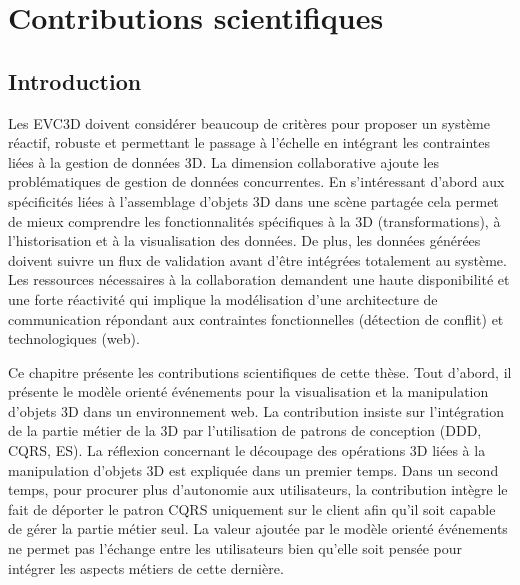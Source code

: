 \chapter{Contributions scientifiques}
\chaptertable
\section{Introduction}
Les \gls{EVC3D} doivent considérer beaucoup de critères pour 
proposer un système réactif, robuste et permettant le passage à l'échelle en 
intégrant les contraintes liées à la gestion de données \gls{3D}. La dimension 
collaborative ajoute les problématiques de gestion de données concurrentes.
En s'intéressant d'abord aux spécificités liées à 
l'assemblage d'objets \gls{3D} dans une scène partagée cela permet de 
mieux comprendre les fonctionnalités spécifiques à la \gls{3D} (transformations), 
à l'historisation et à la visualisation des données. De plus, les données générées
doivent suivre un flux de validation avant d'être intégrées totalement au système.
Les ressources nécessaires à la collaboration demandent une haute disponibilité 
et une forte réactivité qui implique la modélisation d'une architecture 
de communication répondant aux contraintes fonctionnelles (détection de conflit) 
et technologiques (web).

Ce chapitre présente les contributions scientifiques de cette thèse.
Tout d'abord, il présente le modèle orienté événements pour la 
visualisation et la manipulation d'objets \gls{3D} dans un environnement web. La 
contribution insiste sur l'intégration de la partie métier de la \gls{3D} par l'utilisation 
de
patrons de conception (\gls{DDD}, \gls{CQRS}, \gls{ES}). La réflexion concernant 
le découpage des opérations \gls{3D} liées à la manipulation d'objets \gls{3D} est 
expliquée 
dans un premier temps. Dans un second temps, pour procurer plus d'autonomie 
aux utilisateurs, la contribution intègre le fait de déporter le patron \gls{CQRS} 
uniquement sur le client afin qu'il soit capable de gérer la partie métier seul. 
La valeur ajoutée par le modèle orienté événements ne permet pas l'échange entre les
utilisateurs bien qu'elle soit pensée pour intégrer les aspects métiers de cette
dernière. 

